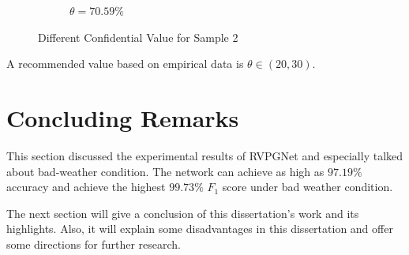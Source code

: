 \begin{spacing}{1.5}
\begin{figure}[!ht]
\begin{subfigure}[b]{0.49\textwidth}
        \caption{$\theta = 70.59\%$}
    \end{subfigure}
    \caption{Different Confidential Value for Sample 2}
    \label{fig:threshold2}
\end{figure}

A recommended value based on empirical data is $\theta \in (20,30)$.

\section{Concluding Remarks}

This section discussed the experimental results of RVPGNet and especially talked about bad-weather condition. The network can achieve as high as $97.19\%$ accuracy and achieve the highest $99.73\%$ $F_1$ score under bad weather condition.

The next section will give a conclusion of this dissertation's work and its highlights. Also, it will explain some disadvantages in this dissertation and offer some directions for further research.

\end{spacing}
\newpage

